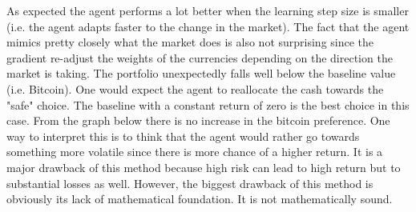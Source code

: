 \documentclass[a4paper,12pt]{article}
\begin{document}
As expected the agent performs a lot better when the learning step size is smaller (i.e. the agent adapts faster to the change in the market). The fact that the agent mimics pretty closely what the market does is also not surprising since the gradient re-adjust the weights of the currencies depending on the direction the market is taking. The portfolio unexpectedly falls well below the baseline value (i.e. Bitcoin). One would expect the agent to reallocate the cash towards the "safe" choice. The baseline with a constant return of zero is the best choice in this case. From the graph below there is no increase in the bitcoin preference. One way to interpret this is to think that the agent would rather go towards something more volatile since there is more chance of a higher return. It is a major drawback of this method because high risk can lead to high return but to substantial losses as well. However, the biggest drawback of this method is obviously its lack of mathematical foundation. It is not mathematically sound.
\end{document}
